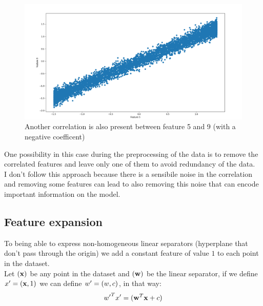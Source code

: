 \begin{figure}[h]
    \includegraphics[width=\textwidth]{images/feature_5_9_correlation.png}
    \caption{Another correlation is also present between feature 5 and 9 (with a negative coefficent)}
    \label{fig:corr59}
\end{figure}

One possibility in this case during the preprocessing of the data is to remove the correlated features and leave only one of them to avoid redundancy of the data.\\
I don't follow this approach because there is a sensibile noise in the correlation and removing some features can lead to also removing this noise that can encode important information on the model.\\


\subsection{Feature expansion}
To being able to express non-homogeneous linear separators (hyperplane that don't pass through the origin) we add a constant feature of value $1$ to each point in the dataset.\\
Let $\bf(x)$ be any point in the dataset and $\bf(w)$ be the linear separator, if we define $x' = ({\bf x}, 1)$ we can define $w' = ({\bf} w, c)$, in that way: $${w'}^T x' = ({\bf w}^T {\bf x} + c)$$\\
